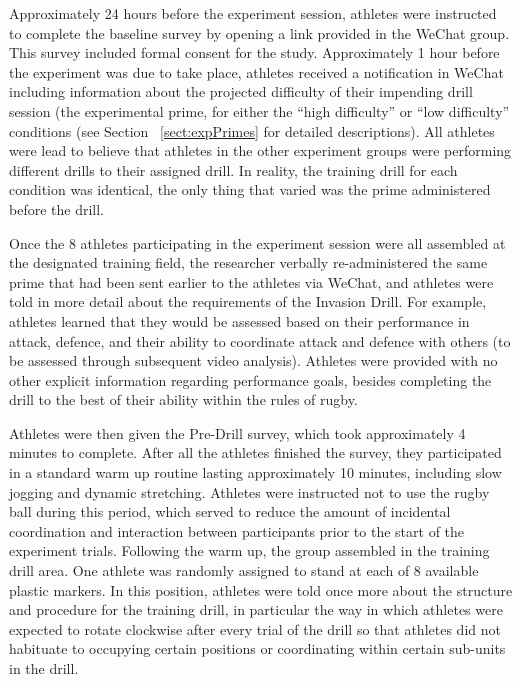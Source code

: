 \begin{CJK}{UTF8}{gbsn}
Approximately 24 hours before the experiment session, athletes were instructed to complete the baseline survey by opening a link provided in the WeChat group.  This survey included formal consent for the study.  Approximately 1 hour before the experiment was due to take place, athletes received a notification in WeChat including information about the projected difficulty of their impending drill session (the experimental prime, for either the ``high difficulty'' or ``low difficulty'' conditions (see Section ~\ref{sect:expPrimes} for detailed descriptions).   All athletes were lead to believe that athletes in the other experiment groups were performing different drills to their assigned drill.  In reality, the training drill for each condition was identical, the only thing that varied was the prime administered before the drill.

Once the 8 athletes participating in the experiment session were all assembled at the designated training field, the researcher verbally re-administered the same prime that had been sent earlier to the athletes via WeChat, and athletes were told in more detail about the requirements of the Invasion Drill.  For example, athletes learned that they would be assessed based on their performance in attack, defence, and their ability to coordinate attack and defence with others (to be assessed through subsequent video analysis).  Athletes were provided with no other explicit information regarding performance goals, besides completing the drill to the best of their ability within the rules of rugby.


Athletes were then given the Pre-Drill survey, which took approximately 4 minutes to complete.  After all the athletes finished the survey, they participated in a standard warm up routine lasting approximately 10 minutes, including slow jogging and dynamic stretching.  Athletes were instructed not to use the rugby ball during this period, which served to reduce the amount of incidental coordination and interaction between participants prior to the start of the experiment trials.  Following the warm up, the group assembled in the training drill area.  One athlete was randomly assigned to stand at each of 8 available plastic markers.  In this position, athletes were told once more about the structure and procedure for the training drill, in particular the way in which athletes were expected to rotate clockwise after every trial of the drill so that athletes did not habituate to occupying certain positions or coordinating within certain sub-units in the drill.


\end{CJK}
